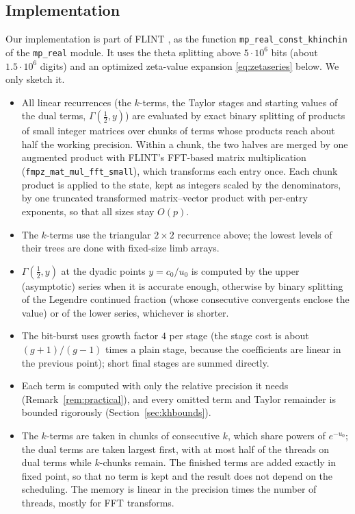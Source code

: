 \documentclass[11pt,reqno]{amsart}
\theoremstyle{definition}
\theoremstyle{remark}
\begin{document}
\subsection{Implementation}\label{sec:khimpl}
Our implementation is part of FLINT \cite{FLINT}, as the function
\texttt{mp\_real\_const\_khinchin} of the \texttt{mp\_real} module. It uses the theta splitting above
$5\cdot10^6$ bits (about $1.5\cdot10^6$ digits) and an optimized zeta-value expansion \eqref{eq:zetaseries} below.
We only sketch it.
\begin{itemize}
\item All linear recurrences (the $k$-terms, the Taylor stages and starting values of the dual terms,
$\Gamma(\frac12, y)$) are evaluated by exact binary splitting of products of small integer matrices over chunks of
terms whose products reach about half the working precision. Within a chunk, the two halves are merged by one
augmented product with FLINT's FFT-based matrix multiplication (\texttt{fmpz\_mat\_mul\_fft\_small}), which
transforms each entry once. Each chunk product is applied to the state, kept as integers scaled by the denominators,
by one truncated transformed matrix--vector product with per-entry exponents, so that all sizes stay $O(p)$.
\item The $k$-terms use the triangular $2\times2$ recurrence above; the lowest levels of their trees are done with
fixed-size limb arrays.
\item $\Gamma(\frac12, y)$ at the dyadic points $y = c_0/u_0$ is computed by the upper (asymptotic) series when it is
accurate enough, otherwise by binary splitting of the Legendre continued fraction (whose consecutive convergents
enclose the value) or of the lower series, whichever is shorter.
\item The bit-burst uses growth factor $4$ per stage (the stage cost is about $(g+1)/(g-1)$ times a plain stage,
because the coefficients are linear in the previous point); short final stages are summed directly.
\item Each term is computed with only the relative precision it needs (Remark~\ref{rem:practical}), and every omitted
term and Taylor remainder is bounded rigorously (Section~\ref{sec:khbounds}).
\item The $k$-terms are taken in chunks of consecutive $k$, which share powers of $e^{-u_0}$; the dual terms are taken
largest first, with at most half of the threads on dual terms while $k$-chunks remain. The finished terms are added
exactly in fixed point, so that no term is kept and the result does not depend on the scheduling. The memory is linear
in the precision times the number of threads, mostly for FFT transforms.
\end{itemize}
\end{document}
